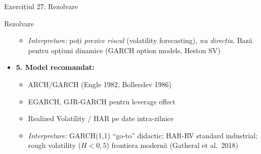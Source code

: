\documentclass[9pt, aspectratio=169, t]{beamer}
\begin{document}
\begin{frame}[shrink=40]{Exercițiul 27: Rezolvare}
\begin{cminipage}{0.95\textwidth}
\begin{exampleblock}{Rezolvare}
\begin{itemize}
\begin{itemize}
        \item \textit{Interpretare:} poți \emph{prezice riscul} (volatility forecasting), \emph{nu direcția}. Bază pentru opțiuni dinamice (GARCH option models, Heston SV)
    \end{itemize}
    \item \textbf{5. Model recomandat:}
    \begin{itemize}\setlength{\itemsep}{0pt}
        \item ARCH/GARCH (Engle 1982, Bollerslev 1986)
        \item EGARCH, GJR-GARCH pentru leverage effect
        \item Realized Volatility / HAR pe date intra-zilnice
        \item \textit{Interpretare:} GARCH(1,1) ``go-to'' didactic; HAR-RV standard industrial; rough volatility ($H < 0{,}5$) frontiera modernă (Gatheral et al.\ 2018)
    \end{itemize}
\end{itemize}
\end{exampleblock}
\end{cminipage}
\end{frame}
\end{document}
